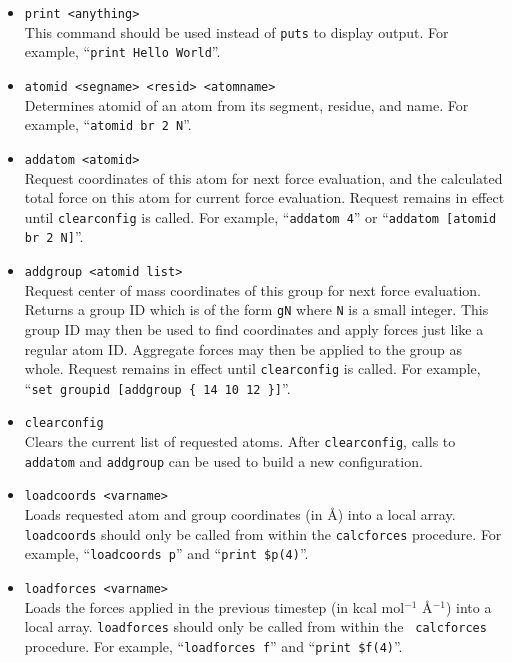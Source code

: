 \begin{itemize}

\item
{\tt print <anything>} \\
This command should be used instead of {\tt puts} to display output.
For example, ``\verb&print Hello World&''.

\item
{\tt atomid <segname> <resid> <atomname>} \\
Determines atomid of an atom from its segment, residue, and name.
For example, ``{\tt atomid br 2 N}''.

\item
{\tt addatom <atomid>} \\
Request coordinates of this atom for next force evaluation, and
the calculated total force on this atom for current force evaluation.
Request remains in effect until {\tt clearconfig} is called.
For example, ``{\tt addatom 4}'' or ``{\tt addatom [atomid br 2 N]}''.

\item
{\tt addgroup <atomid list>} \\
Request center of mass coordinates of this group for next force evaluation.
Returns a group ID which is of the form {\tt gN} where {\tt N} is a small integer.
This group ID may then be used to find coordinates and apply forces just like a regular atom ID.
Aggregate forces may then be applied to the group as whole.
Request remains in effect until {\tt clearconfig} is called.
For example, ``{\tt set groupid [addgroup \{ 14 10 12 \}]}''.

\item
{\tt clearconfig} \\
Clears the current list of requested atoms.  After {\tt clearconfig},
calls to {\tt addatom} and {\tt addgroup} can be used to build a new
configuration.

\item
{\tt loadcoords <varname>} \\
Loads requested atom and group coordinates (in \AA) into a local array.
{\tt loadcoords} should only be called from within the {\tt calcforces} procedure.
For example, ``{\tt loadcoords p}'' and ``{\tt print \$p(4)}''.

\item
{\tt loadforces <varname>} \\
Loads the forces applied in the previous timestep (in kcal mol$^{-1}$
\AA$^{-1}$) into a local array.
{\tt loadforces} should only be called from within the {\tt
calcforces} procedure.
For example, ``{\tt loadforces f}'' and ``{\tt print \$f(4)}''.


\end{itemize}
